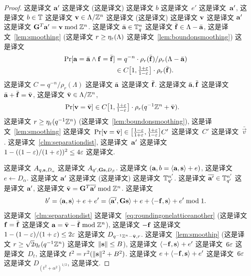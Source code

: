 \begin{proof}
  这是译文 $\veca'$ 这是译文  (这是译文) 这是译文 $b$ 这是译文~$e'$ 这是译文~$\veca'$, 这是译文 $b \in
  \T$ 这是译文 $\vecv \in \Lambda/\Z^{n}$ 这是译文 (这是译文) 这是译文 $\vecv$ 这是译文  $\veca'$ 这是译文 $\matG^{T} \veca' = \vecv \bmod \Z^{n}$.  这是译文 $\bar{\veca} \in \T_q^n$ 这是译文 $\bar{\vecf} \in \Lambda - \bar{\veca}$, 这是译文~\ref{lem:smoothing}  (这是译文 $r \ge \smootheps(\Lambda)$ 这是译文~\ref{lem:boundonsmoothing}) 这是译文  \begin{align}\label{eq:roundingonelatticeanother}
	  \Pr[\veca = \bar{\veca} \wedge \vecf = \bar{\vecf}] &= q^{-n} \cdot \rho_r(\bar{\vecf}) / \rho_r(\Lambda-\bar{\veca}) \nonumber \\
		& \in C \bracks[\big]{1,\tfrac{1+\epsilon}{1-\epsilon}}\cdot \rho_r(\bar \vecf).
	\end{align}  这是译文 $C=q^{-n}/\rho_{r}(\Lambda)$ 这是译文 $\bar{\veca}$ 这是译文 $\bar{\vecf}$.  这是译文 $\bar \veca, \bar \vecf$ 这是译文 $\bar \veca + \bar \vecf = \bar \vecv$, 这是译文 $\bar{\vecv} \in \Lambda/\Z^{n}$,  \begin{align*}
    \Pr[\vecv = \bar{\vecv}] 
    &\in C \bracks[\big]{1,\tfrac{1+\epsilon}{1-\epsilon}} \cdot
    \rho_{r}(q^{-1} \Z^{n} + \bar{\vecv}).
  \end{align*}  这是译文 $r
  \geq \smootheps(q^{-1} \Z^{n})$ (这是译文~\ref{lem:boundonsmoothing}), 这是译文~\ref{lem:smoothing}  这是译文~$\Pr[\vecv = \bar{\vecv}] \in \bracks[\big]{\tfrac{1-\epsilon}{1+\epsilon},\tfrac{1+\epsilon}{1-\epsilon}} C'$ 这是译文~$C'$ 这是译文~$\bar{\vec{v}}$. 这是译文~\ref{clm:separationdist}, 这是译文~$\veca'$ 这是译文~$1-((1-\eps)/(1+\eps))^2 \le 4\epsilon$ 这是译文.

  这是译文 $A_{q,\vecs,D_{\alpha}}$  这是译文 $A_{q', \matG \vecs, D_{\beta}}$.  这是译文 $(\veca,b=\inner{\veca,\vecs}+e)$, 这是译文 $e
  \gets D_{\alpha}$.  这是译文 $\veca'$ 这是译文 (这是译文)  这是译文~$\T_{q'}^{n'}$.  这是译文 $\overline{\veca'} \in \T_{q'}^{n'}$ 这是译文 $\veca'$,  这是译文 $\bar \vecv = \matG^{T} \overline{\veca'} \bmod \Z^{n}$.  这是译文  \[ b' = \inner{\veca,\vecs} + e + e' = \inner{\overline{\veca'}, \matG \vecs} +
  e + \inner{-\vecf, \vecs} + e' \bmod 1. \]  这是译文~\ref{clm:separationdist} 这是译文~\eqref{eq:roundingonelatticeanother} (这是译文 $\vecf=\bar \vecf$ 这是译文 $\veca = \bar \vecv - \bar \vecf \bmod \Z^n$),  这是译文 $-\vecf$ 这是译文~$1-(1-\eps)/(1+\eps) \le 2 \eps$ 这是译文  $D_{q^{-1}\Z^{n}-\bar \vecv, r}$.  这是译文~\ref{lem:smoothip} (这是译文 $r
  \geq \sqrt{2} \smootheps(q^{-1} \Z^{n})$ 这是译文~$\length{\vecs} \le B$), 这是译文 $\inner{-\vecf,\vecs} + e'$ 这是译文~$6 \eps$  这是译文~$D_{t}$, 这是译文 $t^{2} = r^{2}(\length{\vecs}^{2}+B^{2})$.  这是译文 $e+\inner{-\vecf,\vecs} + e'$ 这是译文~$6 \eps$  这是译文 $D_{(t^2+\alpha^2)^{1/2}}$, 这是译文.
\end{proof}

